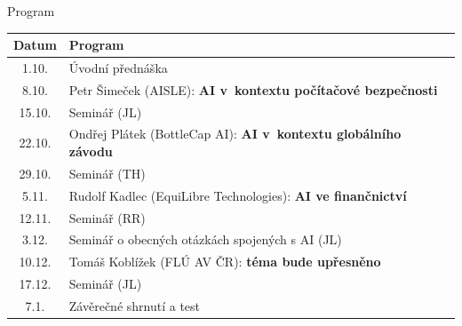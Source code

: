 \begin{frame}{Program}

    \footnotesize\centering
    \begin{tabular}{cl}
        \toprule
    Datum   &   Program \\ \midrule
     1.10. & Úvodní přednáška \\ \midrule

     8.10. & Petr Šimeček (AISLE): \hfill \textbf{AI v~kontextu počítačové bezpečnosti} \\
    15.10. & Seminář (JL) \\ \midrule

    22.10. & Ondřej Plátek (BottleCap AI): \hfill \textbf{AI v~kontextu globálního závodu} \\
    29.10. & Seminář (TH) \\ \midrule

     5.11. & Rudolf Kadlec (EquiLibre Technologies): \hfill \textbf{AI ve finančnictví} \\
    12.11. & Seminář (RR) \\ \midrule

     3.12. & Seminář o obecných otázkách spojených s AI (JL) \\ \midrule

    10.12. & Tomáš Koblížek (FLÚ AV ČR): \hfill \textbf{téma bude upřesněno} \\
    17.12. & Seminář (JL) \\ \midrule

     7.1. & Závěrečné shrnutí a test \\
    \bottomrule
    \end{tabular}

\end{frame}

